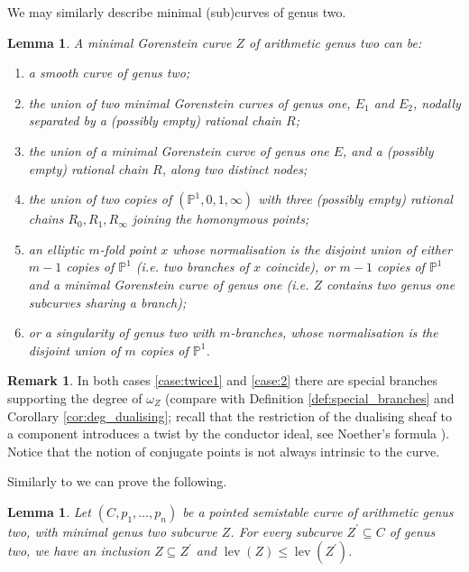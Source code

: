 \documentclass[11pt]{amsart}
\newcommand{\PP}{\mathbb P}
\newcommand{\OO}{\mathcal O}
\newcommand{\lev}{\operatorname{lev}}
\theoremstyle{plain}
\newtheorem{lem}[thm]{Lemma}
\theoremstyle{definition}
\newtheorem{rem}[thm]{Remark}
\begin{document}
We may similarly describe minimal (sub)curves of genus two.
\begin{lem}\label{lem:min2}
 A minimal Gorenstein curve $Z$ of arithmetic genus two can be:
 \begin{enumerate}
  \item a smooth curve of genus two;
  \item the union of two minimal Gorenstein curves of genus one, $E_1$ and $E_2$, nodally separated by a (possibly empty) rational chain $R$;
  \item the union of a minimal Gorenstein curve of genus one $E$, and a (possibly empty) rational chain $R$, along two distinct nodes;
  \item the union of two copies of $(\PP^1,0,1,\infty)$ with three (possibly empty) rational chains $R_0, R_1, R_\infty$ joining the homonymous points;
  \item\label{case:twice1} an elliptic $m$-fold point $x$ whose normalisation is the disjoint union of either $m-1$ copies of $\PP^1$ (i.e. two branches of $x$ coincide), or $m-1$ copies of $\PP^1$ and a minimal Gorenstein curve of genus one (i.e. $Z$ contains two genus one subcurves sharing a branch);
  \item\label{case:2} or a singularity of genus two with $m$-branches, whose normalisation is the disjoint union of $m$ copies of $\PP^1$.
 \end{enumerate}
\end{lem}
\begin{rem}\label{rem:special}
In both cases \eqref{case:twice1} and \eqref{case:2} there are special branches supporting the degree of $\omega_Z$ (compare with Definition \ref{def:special_branches} and Corollary \ref{cor:deg_dualising}; recall that the restriction of the dualising sheaf to a component introduces a twist by the conductor ideal, see Noether's formula \cite[Proposition 1.2]{Catanese}). Notice that the notion of conjugate points is not always intrinsic to the curve.\end{rem}

Similarly to \cite[Corollary 3.2, Lemma 3.5]{SMY1} we can prove the following.
\begin{lem}
 Let $(C,p_1,\ldots,p_n)$ be a pointed \emph{semistable} curve of arithmetic genus two, with minimal genus two subcurve $Z$. For every subcurve $Z^\prime\subseteq C$ of genus two, we have an inclusion $Z\subseteq Z^\prime$ and $\lev(Z)\leq\lev(Z^\prime)$.
\end{lem}
\end{document}

